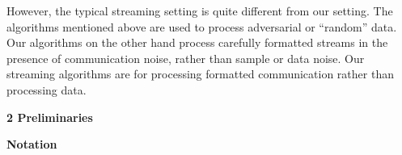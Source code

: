 \documentclass[10pt,a4paper]{article}
\begin{document}
However, the typical streaming setting is quite different from our setting. The algorithms mentioned above are used to process adversarial or “random” data. Our algorithms on the other hand process carefully formatted streams in the presence of communication noise, rather than sample or data noise. Our streaming algorithms are for processing formatted communication rather than processing data.\par







\par\medskip\noindent\textbf{
2 Preliminaries}\par




\par\medskip\noindent\textbf{Notation}\par
\end{document}
